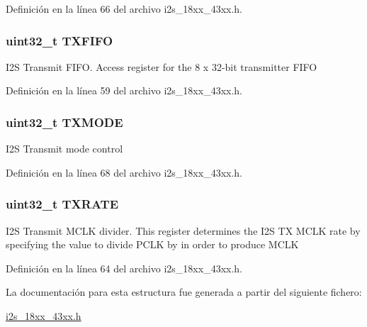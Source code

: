 Definición en la línea 66 del archivo i2s\+\_\+18xx\+\_\+43xx.\+h.

\subsubsection[{\texorpdfstring{T\+X\+F\+I\+FO}{TXFIFO}}]{ uint32\+\_\+t T\+X\+F\+I\+FO}\hypertarget{struct_l_p_c___i2_s___t_a7135d06efef563cc37dd1ac53247af33}{}\label{struct_l_p_c___i2_s___t_a7135d06efef563cc37dd1ac53247af33}
I2S Transmit F\+I\+FO. Access register for the 8 x 32-\/bit transmitter F\+I\+FO 

Definición en la línea 59 del archivo i2s\+\_\+18xx\+\_\+43xx.\+h.

\subsubsection[{\texorpdfstring{T\+X\+M\+O\+DE}{TXMODE}}]{ uint32\+\_\+t T\+X\+M\+O\+DE}\hypertarget{struct_l_p_c___i2_s___t_a0f90530813c0449c4e78252fe9f00a24}{}\label{struct_l_p_c___i2_s___t_a0f90530813c0449c4e78252fe9f00a24}
I2S Transmit mode control 

Definición en la línea 68 del archivo i2s\+\_\+18xx\+\_\+43xx.\+h.

\subsubsection[{\texorpdfstring{T\+X\+R\+A\+TE}{TXRATE}}]{ uint32\+\_\+t T\+X\+R\+A\+TE}\hypertarget{struct_l_p_c___i2_s___t_ac9bd66e9b642f40484f2ac314f51ba06}{}\label{struct_l_p_c___i2_s___t_ac9bd66e9b642f40484f2ac314f51ba06}
I2S Transmit M\+C\+LK divider. This register determines the I2S TX M\+C\+LK rate by specifying the value to divide P\+C\+LK by in order to produce M\+C\+LK 

Definición en la línea 64 del archivo i2s\+\_\+18xx\+\_\+43xx.\+h.



La documentación para esta estructura fue generada a partir del siguiente fichero\+:\begin{DoxyCompactItemize}
\item 
\hyperlink{i2s__18xx__43xx_8h}{i2s\+\_\+18xx\+\_\+43xx.\+h}\end{DoxyCompactItemize}
